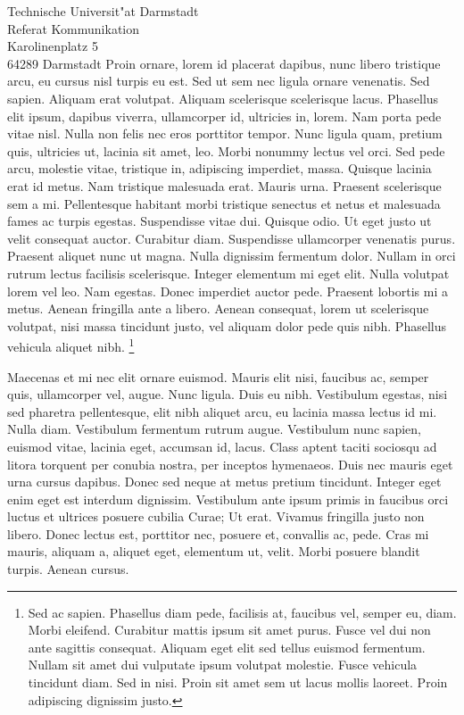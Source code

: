 \documentclass[adr=clemens,accentcolor=tud9c,twoside]{tudletter}
\begin{document}
\begin{letter}{%
    Technische Universit"at Darmstadt\\%
    Referat Kommunikation\\%
    Karolinenplatz 5\\%
    64289 Darmstadt}
    Proin ornare, lorem id placerat dapibus, nunc libero tristique arcu, eu cursus nisl turpis eu est. Sed ut sem nec ligula ornare venenatis. Sed sapien. Aliquam erat volutpat. Aliquam scelerisque scelerisque lacus. Phasellus elit ipsum, dapibus viverra, ullamcorper id, ultricies in, lorem. Nam porta pede vitae nisl. Nulla non felis nec eros porttitor tempor. Nunc ligula quam, pretium quis, ultricies ut, lacinia sit amet, leo. Morbi nonummy lectus vel orci. Sed pede arcu, molestie vitae, tristique in, adipiscing imperdiet, massa. Quisque lacinia erat id metus. Nam tristique malesuada erat. Mauris urna. Praesent scelerisque sem a mi. Pellentesque habitant morbi tristique senectus et netus et malesuada fames ac turpis egestas. Suspendisse vitae dui.
    Quisque odio. Ut eget justo ut velit consequat auctor. Curabitur diam. Suspendisse ullamcorper
    venenatis purus. Praesent aliquet nunc ut magna. Nulla dignissim fermentum dolor. Nullam in
    orci rutrum lectus facilisis scelerisque. Integer elementum mi eget elit. Nulla volutpat lorem
    vel leo. Nam egestas. Donec imperdiet auctor pede. Praesent lobortis mi a metus. Aenean
    fringilla ante a libero. Aenean consequat, lorem ut scelerisque volutpat, nisi massa tincidunt
    justo, vel aliquam dolor pede quis nibh. Phasellus vehicula aliquet nibh.%
    \footnote{Sed ac sapien. Phasellus diam pede, facilisis at, faucibus vel, semper eu, diam. Morbi eleifend. Curabitur mattis ipsum sit amet purus. Fusce vel dui non ante sagittis consequat. Aliquam eget elit sed tellus euismod fermentum. Nullam sit amet dui vulputate ipsum volutpat molestie. Fusce vehicula tincidunt diam. Sed in nisi. Proin sit amet sem ut lacus mollis laoreet. Proin adipiscing dignissim justo.}

    Maecenas et mi nec elit ornare euismod. Mauris elit nisi, faucibus ac, semper quis, ullamcorper
    vel, augue. Nunc ligula. Duis eu nibh. Vestibulum egestas, nisi sed pharetra pellentesque, elit
    nibh aliquet arcu, eu lacinia massa lectus id mi. Nulla diam. Vestibulum fermentum rutrum
    augue. Vestibulum nunc sapien, euismod vitae, lacinia eget, accumsan id, lacus. Class aptent
    taciti sociosqu ad litora torquent per conubia nostra, per inceptos hymenaeos. Duis nec mauris
    eget urna cursus dapibus. Donec sed neque at metus pretium tincidunt. Integer eget enim eget
    est interdum dignissim. Vestibulum ante ipsum primis in faucibus orci luctus et ultrices
    posuere cubilia Curae; Ut erat. Vivamus fringilla justo non libero. Donec lectus est, porttitor
    nec, posuere et, convallis ac, pede. Cras mi mauris, aliquam a, aliquet eget, elementum ut,
    velit. Morbi posuere blandit turpis. Aenean cursus.


\end{letter}
\end{document}
